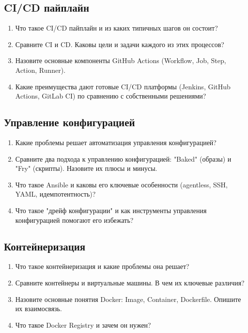 \documentclass[12pt,a4paper]{article}
\begin{document}
    \subsection{CI/CD пайплайн}
    \begin{enumerate}
        \item Что такое CI/CD пайплайн и из каких типичных шагов он состоит?
        \item Сравните CI и CD. Каковы цели и задачи каждого из этих процессов?
        \item Назовите основные компоненты GitHub Actions (Workflow, Job, Step, Action, Runner).
        \item Какие преимущества дают готовые CI/CD платформы (Jenkins, GitHub Actions, GitLab CI) по сравнению с собственными решениями?
    \end{enumerate}

    \subsection{Управление конфигурацией}
    \begin{enumerate}
        \item Какие проблемы решает автоматизация управления конфигурацией?
        \item Сравните два подхода к управлению конфигурацией: "Baked" (образы) и "Fry" (скрипты). Назовите их плюсы и минусы.
        \item Что такое Ansible и каковы его ключевые особенности (agentless, SSH, YAML, идемпотентность)?
        \item Что такое "дрейф конфигурации" и как инструменты управления конфигурацией помогают его избежать?
    \end{enumerate}

    \subsection{Контейнеризация}
    \begin{enumerate}
        \item Что такое контейнеризация и какие проблемы она решает?
        \item Сравните контейнеры и виртуальные машины. В чем их ключевые различия?
        \item Назовите основные понятия Docker: Image, Container, Dockerfile. Опишите их взаимосвязь.
        \item Что такое Docker Registry и зачем он нужен?
    \end{enumerate}
\end{document}
